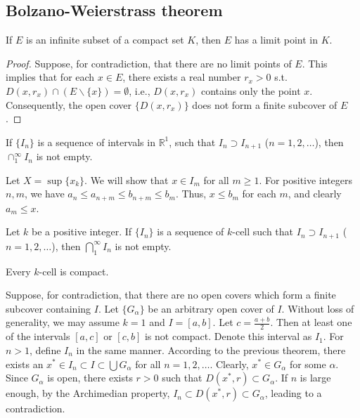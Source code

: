 \subsection{Bolzano-Weierstrass theorem}
\begin{theorem}
\label{thm:bolzano_weierstrass_thm_in_compact_set}
If $E$ is an infinite subset of a compact set $K$, then $E$ has a limit point in $K$.
\end{theorem}
\begin{proof}
Suppose, for contradiction, that there are no limit points of $E$. This implies that for each $x\in E$, there exists a real number $r_x>0$ s.t. $D(x,r_x)\cap (E\backslash \{x\}) = \emptyset$, i.e., $D(x,r_x)$ contains only the point $x$. Consequently, the open cover $\{D(x,r_x)\}$ does not form a finite subcover of $E$.
\end{proof}

\begin{theorem}[pma 2.38]
If $\{I_n\}$ is a sequence of intervals in $\mathbb{R}^1$, such that $I_n\supset I_{n+1}$ ($n=1,2,\dots$), then $\cap_1^\infty I_n$ is not empty.
\end{theorem}
\begin{hardproof}
Let $X=\sup\{x_k\}$. We will show that $x\in I_m$ for all $m\geq1$. For positive integers $n,m$, we have $a_n\leq a_{n+m}\leq b_{n+m}\leq b_m$. Thus, $x\leq b_m$ for each $m$, and clearly $a_m\leq x$.
\end{hardproof}

\begin{theorem}[pma 2.39]
Let $k$ be a positive integer. If $\{I_n\}$ is a sequence of $k$-cell such that $I_n\supset I_{n+1}$ ($n=1,2,\dots$), then $\bigcap_1^\infty I_n$ is not empty.
\end{theorem}

\begin{theorem}[pma 2.40]
Every $k$-cell is compact.
\end{theorem}
\begin{hardproof}
Suppose, for contradiction, that there are no open covers which form a finite subcover containing $I$. Let $\{G_\alpha\}$ be an arbitrary open cover of $I$. Without loss of generality, we may assume $k=1$ and $I=[a,b]$. Let $c=\frac{a+b}{2}$. Then at least one of the intervals $[a,c]$ or $[c,b]$ is not compact. Denote this interval as $I_1$. For $n>1$, define $I_n$ in the same manner. According to the previous theorem, there exists an $x^*\in I_n\subset I\subset \bigcup G_\alpha$ for all $n=1,2,\dots$. Clearly, $x^*\in G_\alpha$ for some $\alpha$. Since $G_\alpha$ is open, there exists $r>0$ such that $D(x^*,r)\subset G_\alpha$. If $n$ is large enough, by the Archimedian property, $I_n\subset D(x^*,r)\subset G_\alpha$, leading to a contradiction.
\end{hardproof}

